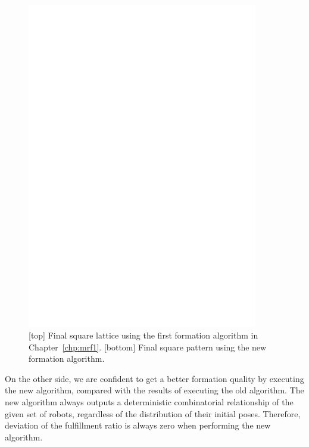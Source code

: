     \begin{figure}
        \centering
        \begin{minipage}{0.75\linewidth}
            \centering
            \includegraphics[width=0.9\textwidth]{figs/octsq40_498_0_633}
        \end{minipage}
        \caption{[top] Final square lattice using the first formation algorithm in Chapter~\ref{chp:mrf1}. [bottom] Final square pattern using the new formation algorithm.}
        \label{fig:forty_octsq_comp}
    \end{figure}

  On the other side, we are confident to get a better formation
  quality by executing the new algorithm, compared with the results of
  executing the old algorithm. 
  The new algorithm always outputs a
  deterministic combinatorial relationship of the given set of robots,
  regardless of the distribution of their initial poses. 
  Therefore, deviation of the fulfillment ratio
  is always zero when performing the new algorithm.


